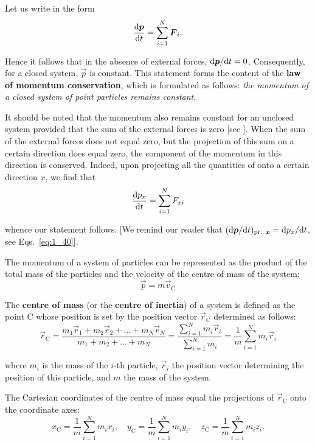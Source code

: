 Let us write  in the form
\begin{equation}\label{eq:3_88}
\frac{\mathrm{d}\boldsymbol{p}}{\mathrm{d} t} = \sum_{i=1}^{N} \boldsymbol{F}_i.
\end{equation}

\noindent
Hence it follows that in the absence of external forces, $\mathrm{d}\boldsymbol{p}/\mathrm{d} t=0$. Consequently, for a closed system, $\vec{p}$ is constant. This statement forms the content of the \textbf{law of momentum conservation}, which is formulated as follows: \textit{the momentum of a closed system of point particles remains constant}.

It should be noted that the momentum also remains constant for an unclosed system provided that the sum of the external forces is zero [see ]. When the sum of the external forces does not equal zero, but the projection of this sum on a certain direction does equal zero, the component of the momentum in this direction is conserved. Indeed, upon projecting all the quantities of  onto a certain direction $x$, we find that
\begin{equation}\label{eq:3_89}
\frac{\mathrm{d} p_x}{\mathrm{d} t} = \sum_{i=1}^{N} F_{xi}
\end{equation}

\noindent
whence our statement follows. [We remind our reader that $(\mathrm{d}\boldsymbol{p}/\mathrm{d} t)_{\text{pr. }\boldsymbol{x}}=\mathrm{d} p_x/\mathrm{d} t$, see Eqs.~\eqref{eq:1_40}].

The momentum of a system of particles can be represented as the product of the total mass of the particles and the velocity of the centre of mass of the system:
\begin{equation}\label{eq:3_90}
\vec{p} = m\vec{v}_{\text{C}}
\end{equation}

The \textbf{centre of mass} (or the \textbf{centre of inertia}) of a system is defined as the point C whose position is set by the position vector $\vec{r}_{\text{C}}$ determined as follows:
\begin{equation}\label{eq:3_91}
\vec{r}_{\text{C}} = \frac{m_1\vec{r}_1+m_2\vec{r}_2+\ldots+m_N\vec{r}_N}{m_1+m_2+\ldots+m_N} = \frac{\sum_{i=1}^N m_i\vec{r}_i}{\sum_{i=1}^N m_i} = \frac{1}{m} \sum_{i=1}^N m_i\vec{r}_i
\end{equation}

\noindent
where $m_i$ is the mass of the $i$-th particle, $\vec{r}_i$ the position vector determining the position of this particle, and  $m$ the mass of the system.

The Cartesian coordinates of the centre of mass equal the projections of $\vec{r}_{\text{C}}$ onto the coordinate axes:
\begin{equation}\label{eq:3_92}
x_{\text{C}} = \frac{1}{m} \sum_{i=1}^N m_i x_i,\quad y_{\text{C}} = \frac{1}{m} \sum_{i=1}^N m_i y_i,\quad
z_{\text{C}} = \frac{1}{m} \sum_{i=1}^N m_i z_i.
\end{equation}

